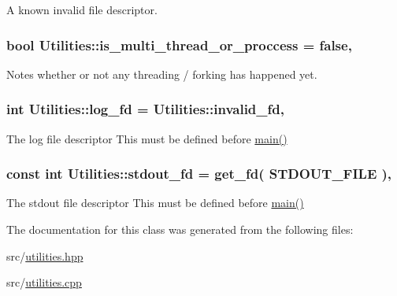 A known invalid file descriptor. 

\hypertarget{class_utilities_af893d8dcd5bb1ba3fc72fc108536bcbc}{
\subsubsection[{is\-\_\-multi\-\_\-thread\-\_\-or\-\_\-proccess}]{\setlength{\rightskip}{0pt plus 5cm}bool Utilities\-::is\-\_\-multi\-\_\-thread\-\_\-or\-\_\-proccess = false\hspace{0.3cm}{\ttfamily [static]}, {\ttfamily [private]}}}\label{class_utilities_af893d8dcd5bb1ba3fc72fc108536bcbc}


Notes whether or not any threading / forking has happened yet. 

\hypertarget{class_utilities_ab2b544c3e3a2b34a81703950c52a75a0}{
\subsubsection[{log\-\_\-fd}]{\setlength{\rightskip}{0pt plus 5cm}int Utilities\-::log\-\_\-fd = {\bf Utilities\-::invalid\-\_\-fd}\hspace{0.3cm}{\ttfamily [static]}, {\ttfamily [private]}}}\label{class_utilities_ab2b544c3e3a2b34a81703950c52a75a0}


The log file descriptor This must be defined before \hyperlink{shadow__stack_8cpp_a0ddf1224851353fc92bfbff6f499fa97}{main()} 

\hypertarget{class_utilities_ac910b642c4a135def84f8cc66a865138}{
\subsubsection[{stdout\-\_\-fd}]{\setlength{\rightskip}{0pt plus 5cm}const int Utilities\-::stdout\-\_\-fd = {\bf get\-\_\-fd}( {\bf S\-T\-D\-O\-U\-T\-\_\-\-F\-I\-L\-E} )\hspace{0.3cm}{\ttfamily [static]}, {\ttfamily [private]}}}\label{class_utilities_ac910b642c4a135def84f8cc66a865138}


The stdout file descriptor This must be defined before \hyperlink{shadow__stack_8cpp_a0ddf1224851353fc92bfbff6f499fa97}{main()} 



The documentation for this class was generated from the following files\-:\begin{DoxyCompactItemize}
\item 
src/\hyperlink{utilities_8hpp}{utilities.\-hpp}\item 
src/\hyperlink{utilities_8cpp}{utilities.\-cpp}\end{DoxyCompactItemize}
